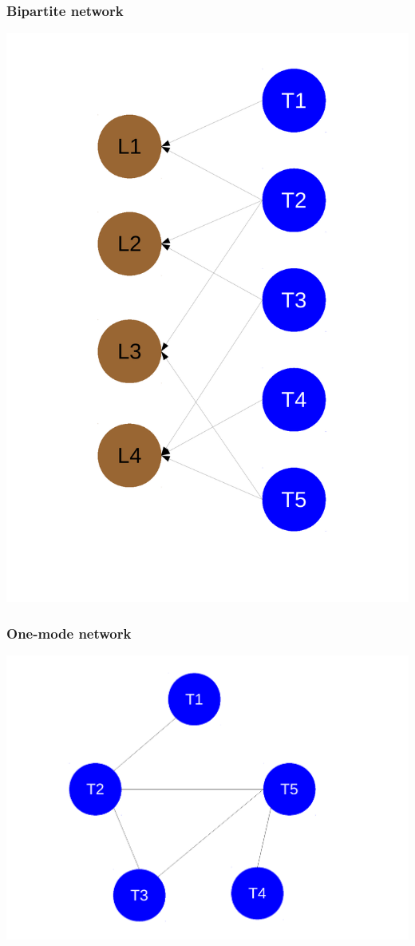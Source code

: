 \documentclass{beamer}
\begin{document}
\begin{frame}
  \frametitle{Bipartite network}
  \begin{center}
    \includegraphics[height = 0.8\textheight, width = \textwidth,  keepaspectratio = true]{figure/bipartite_graph}
  \end{center}
\end{frame}

\begin{frame}
  \frametitle{One-mode network}
  \begin{center}
    \includegraphics[height = 0.8\textheight, width = \textwidth,  keepaspectratio = true]{figure/one_mode}
  \end{center}
\end{frame}
\end{document}
